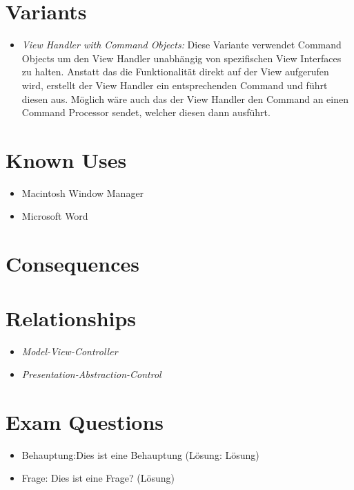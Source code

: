 \section{Variants}
\begin{itemize}
	\item \textit{View Handler with Command Objects:} Diese Variante verwendet Command Objects um den View Handler unabhängig von spezifischen View Interfaces zu halten. Anstatt das die Funktionalität direkt auf der View aufgerufen wird, erstellt der View Handler ein entsprechenden Command und führt diesen aus. Möglich wäre auch das der View Handler den Command an einen Command Processor sendet, welcher diesen dann ausführt.
\end{itemize}

\section{Known Uses}
\begin{itemize}
	\item Macintosh Window Manager
	\item Microsoft Word
\end{itemize}

\section{Consequences}
\begin{itemize}

\end{itemize}

\section{Relationships}
\begin{itemize}
	\item \textit{Model-View-Controller}
	\item \textit{Presentation-Abstraction-Control}
\end{itemize}

\section{Exam Questions}
\begin{itemize}
  	\item Behauptung:Dies ist eine Behauptung (Lösung: Lösung)
    \item Frage: Dies ist eine Frage? (Lösung)
\end{itemize}
